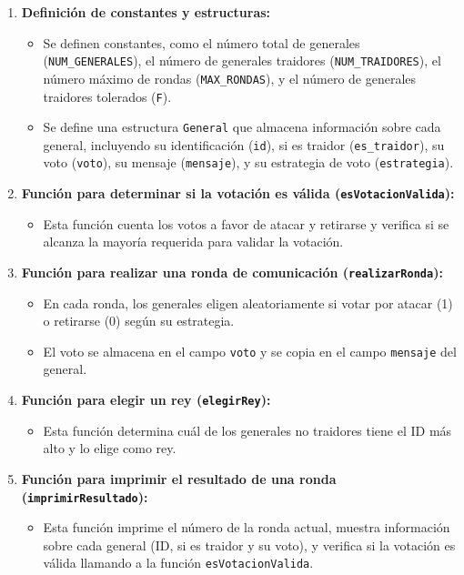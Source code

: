 \documentclass[a4paper,12pt]{article}
\begin{document}
\begin{enumerate}
  \item \textbf{Definición de constantes y estructuras:}
  \begin{itemize}
      \item Se definen constantes, como el número total de generales (\texttt{NUM\_GENERALES}), el número de generales traidores (\texttt{NUM\_TRAIDORES}), el número máximo de rondas (\texttt{MAX\_RONDAS}), y el número de generales traidores tolerados (\texttt{F}).
      \item Se define una estructura \texttt{General} que almacena información sobre cada general, incluyendo su identificación (\texttt{id}), si es traidor (\texttt{es\_traidor}), su voto (\texttt{voto}), su mensaje (\texttt{mensaje}), y su estrategia de voto (\texttt{estrategia}).
  \end{itemize}
  
  \item \textbf{Función para determinar si la votación es válida (\texttt{esVotacionValida}):}
  \begin{itemize}
      \item Esta función cuenta los votos a favor de atacar y retirarse y verifica si se alcanza la mayoría requerida para validar la votación.
  \end{itemize}
  
  \item \textbf{Función para realizar una ronda de comunicación (\texttt{realizarRonda}):}
  \begin{itemize}
      \item En cada ronda, los generales eligen aleatoriamente si votar por atacar (1) o retirarse (0) según su estrategia.
      \item El voto se almacena en el campo \texttt{voto} y se copia en el campo \texttt{mensaje} del general.
  \end{itemize}
  
  \item \textbf{Función para elegir un rey (\texttt{elegirRey}):}
  \begin{itemize}
      \item Esta función determina cuál de los generales no traidores tiene el ID más alto y lo elige como rey.
  \end{itemize}
  
  \item \textbf{Función para imprimir el resultado de una ronda (\texttt{imprimirResultado}):}
  \begin{itemize}
      \item Esta función imprime el número de la ronda actual, muestra información sobre cada general (ID, si es traidor y su voto), y verifica si la votación es válida llamando a la función \texttt{esVotacionValida}.
  \end{itemize}
  

\end{enumerate}
\end{document}
